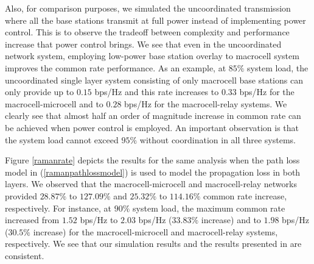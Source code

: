 \documentclass[conference,letterpaper,final,10pt]{IEEEtran}
\begin{document}
Also, for comparison purposes, we simulated the uncoordinated transmission where all the base stations transmit at full power instead of implementing power control. This is to observe the tradeoff between complexity and performance increase that power control brings. We see that even in the uncoordinated network system, employing low-power base station overlay to macrocell system improves the common rate performance. As an example, at $85\%$ system load, the uncoordinated single layer system consisting of only macrocell base stations can only provide up to $0.15$ bps/Hz and this rate increases to $0.33$ bps/Hz for the macrocell-microcell and to $0.28$ bps/Hz for the macrocell-relay systems. We clearly see that almost half an order of magnitude increase in common rate can be achieved when power control is employed. An important observation is that the system load cannot exceed $95\%$ without coordination in all three systems.

Figure \ref{ramanrate} depicts the results for the same analysis when the path loss model in (\ref{ramanpathlossmodel}) is used to model the propagation loss in both layers. We observed that the macrocell-microcell and macrocell-relay networks provided $28.87\%$ to $127.09\%$ and $25.32\%$ to $114.16\%$ common rate increase, respectively. For instance, at $90\%$ system load, the maximum common rate increased from $1.52$ bps/Hz to $2.03$ bps/Hz ($33.83\%$ increase) and to $1.98$ bps/Hz ($30.5\%$ increase) for the macrocell-microcell and macrocell-relay systems, respectively. We see that our simulation results and the results presented in \cite{RamanConf} are consistent.
\end{document}

